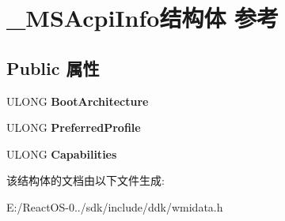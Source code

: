 \hypertarget{struct___m_s_acpi_info}{}\section{\+\_\+\+M\+S\+Acpi\+Info结构体 参考}
\label{struct___m_s_acpi_info}
\subsection*{Public 属性}
\begin{DoxyCompactItemize}
\item 
\mbox{\label{struct___m_s_acpi_info_a71fa8deb49d86d270853f6a673258fe4}} 
U\+L\+O\+NG {\bfseries Boot\+Architecture}
\item 
\mbox{\label{struct___m_s_acpi_info_a1fd88d1441f484de3a0ea3de350a37d4}} 
U\+L\+O\+NG {\bfseries Preferred\+Profile}
\item 
\mbox{\label{struct___m_s_acpi_info_a57aa1ce5b3d00d04ba388c582d1c03d8}} 
U\+L\+O\+NG {\bfseries Capabilities}
\end{DoxyCompactItemize}


该结构体的文档由以下文件生成\+:\begin{DoxyCompactItemize}
\item 
E\+:/\+React\+O\+S-\/0../sdk/include/ddk/wmidata.\+h\end{DoxyCompactItemize}
